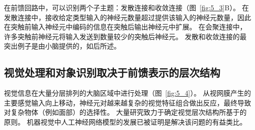 在前馈回路中，可以识别两个子主题：发散连接和收敛连接（图~\ref{fig:5_3}B）。 
在发散连接中，接收给定类型输入的神经元数量超过提供该输入的神经元数量，因此在突触前输入神经元中编码的信息在突触后输出神经元中扩展。
在会聚连接中，许多突触前神经元将输入发送到数量较少的突触后神经元。
发散和收敛连接的最突出例子是由小脑提供的，如后所述。



\subsection{视觉处理和对象识别取决于前馈表示的层次结构}

视觉信息在大量分层排列的大脑区域中进行处理（图~\ref{fig:5_4}）。
从视网膜产生的主要感觉输入向上移动，神经元对越来越复杂的视觉特征组合做出反应，最终导致对复杂物体（例如面部）的选择性。
大量研究致力于确定视觉层次结构所基于的原则。
机器视觉中人工神经网络模型的发展已被证明是解决该问题的有益类比。


